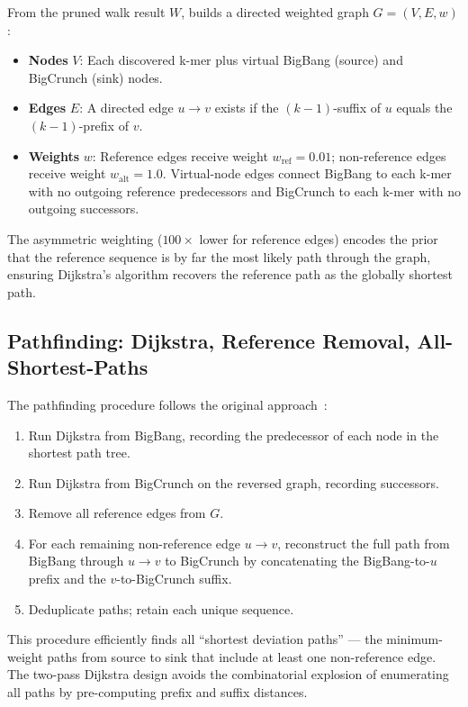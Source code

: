 From the pruned walk result $W$, \kmerdet{} builds a directed weighted graph
$G = (V, E, w)$:

\begin{itemize}
  \item \textbf{Nodes} $V$: Each discovered k-mer plus virtual BigBang (source)
        and BigCrunch (sink) nodes.
  \item \textbf{Edges} $E$: A directed edge $u \to v$ exists if the $(k-1)$-suffix
        of $u$ equals the $(k-1)$-prefix of $v$.
  \item \textbf{Weights} $w$: Reference edges receive weight $w_{\text{ref}} = 0.01$;
        non-reference edges receive weight $w_{\text{alt}} = 1.0$.  Virtual-node
        edges connect BigBang to each k-mer with no outgoing reference predecessors
        and BigCrunch to each k-mer with no outgoing successors.
\end{itemize}

The asymmetric weighting ($100\times$ lower for reference edges) encodes the
prior that the reference sequence is by far the most likely path through the
graph, ensuring Dijkstra's algorithm recovers the reference path as the globally
shortest path.

\subsection{Pathfinding: Dijkstra, Reference Removal, All-Shortest-Paths}
\label{sec:pathfinding}

The pathfinding procedure follows the original \km{} approach~\cite{audoux2020km}:

\begin{enumerate}
  \item Run Dijkstra from BigBang, recording the predecessor of each node in the
        shortest path tree.
  \item Run Dijkstra from BigCrunch on the reversed graph, recording successors.
  \item Remove all reference edges from $G$.
  \item For each remaining non-reference edge $u \to v$, reconstruct the full
        path from BigBang through $u \to v$ to BigCrunch by concatenating the
        BigBang-to-$u$ prefix and the $v$-to-BigCrunch suffix.
  \item Deduplicate paths; retain each unique sequence.
\end{enumerate}

This procedure efficiently finds all ``shortest deviation paths'' --- the
minimum-weight paths from source to sink that include at least one non-reference
edge.  The two-pass Dijkstra design avoids the combinatorial explosion of
enumerating all paths by pre-computing prefix and suffix distances.

